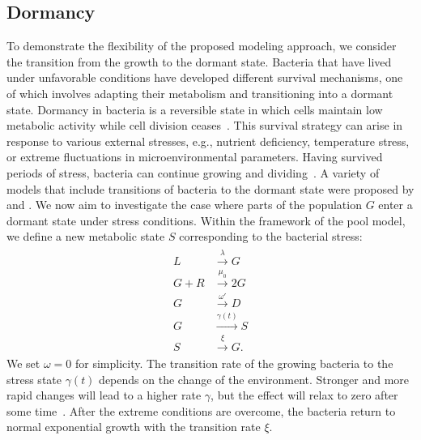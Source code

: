 \documentclass[10pt,1p,authoryear]{elsarticle}
\numberwithin{equation}{section}
\begin{document}
\subsection{Dormancy}
To demonstrate the flexibility of the proposed modeling approach, we consider the transition from the growth to the dormant state. Bacteria that have lived under unfavorable conditions have developed different survival mechanisms, one of which involves adapting their metabolism and transitioning into a dormant state. 
Dormancy in bacteria is a reversible state in which cells maintain low metabolic activity while cell division ceases~\citep{kaprelyants_dormancy_1993}.
This survival strategy can arise in response to various external stresses, e.g., nutrient deficiency, temperature stress, or extreme fluctuations in microenvironmental parameters.
Having survived periods of stress, bacteria can continue growing and dividing~\citep{kell_viability_1998}.
A variety of models that include transitions of bacteria to the dormant state were proposed by \citet{bar_modelling_2002} and \citet{jones_dormancy_2010}.
%
We now aim to investigate the case where parts of the population $G$ enter a dormant state under stress conditions.
Within the framework of the pool model, we define a new metabolic state $S$ corresponding to the bacterial stress:
\begin{align}
\begin{split}
    L &\stackrel{\lambda}{\longrightarrow} G\\
    G+R &\stackrel{\mu_0}{\longrightarrow} 2G\\
    G &\stackrel{\omega'}{\longrightarrow} D\\
    G &\stackrel{\gamma(t)}{\longrightarrow} S\\
    S &\stackrel{\xi}{\longrightarrow} G.
    \end{split}
\end{align}
We set $\omega=0$ for simplicity. The transition rate of the growing bacteria to the stress state $\gamma(t)$ depends on the change of the environment.
Stronger and more rapid changes will lead to a higher rate $\gamma$, but the effect will relax to zero after some time~\citep{lennon_microbial_2011}.
After the extreme conditions are overcome, the bacteria return to normal exponential growth with the transition rate $\xi$.
%
%
\end{document}
